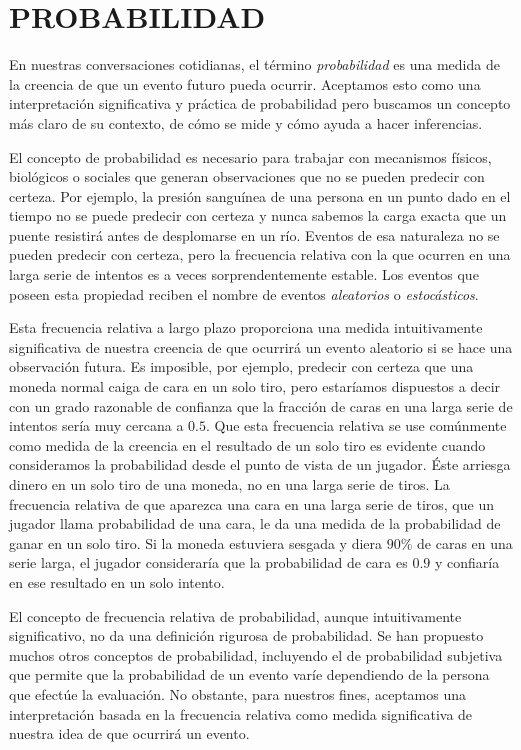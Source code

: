 \chapter{PROBABILIDAD}
\printchaptertableofcontents

En nuestras conversaciones cotidianas, el término \emph{probabilidad} es una medida de la creencia de que un evento futuro pueda ocurrir. Aceptamos esto como una interpretación significativa y práctica de probabilidad pero buscamos un concepto más claro de su contexto, de cómo se mide y cómo ayuda a hacer inferencias.

El concepto de probabilidad es necesario para trabajar con mecanismos físicos, biológicos o sociales que generan observaciones que no se pueden predecir con certeza. Por ejemplo, la presión sanguínea de una persona en un punto dado en el tiempo no se puede predecir con certeza y nunca sabemos la carga exacta que un puente resistirá antes de desplomarse en un río. Eventos de esa naturaleza no se pueden predecir con certeza, pero la frecuencia relativa con la que ocurren en una larga serie de intentos es a veces sorprendentemente estable. Los eventos que poseen esta propiedad reciben el nombre de eventos \emph{aleatorios} o \emph{estocásticos}.

Esta frecuencia relativa a largo plazo proporciona una medida intuitivamente significativa de nuestra creencia de que ocurrirá un evento aleatorio si se hace una observación futura. Es imposible, por ejemplo, predecir con certeza que una moneda normal caiga de cara en un solo tiro, pero estaríamos dispuestos a decir con un grado razonable de confianza que la fracción de caras en una larga serie de intentos sería muy cercana a $0.5$. Que esta frecuencia relativa se use comúnmente como medida de la creencia en el resultado de un solo tiro es evidente cuando consideramos la probabilidad desde el punto de vista de un jugador. Éste arriesga dinero en un solo tiro de una moneda, no en una larga serie de tiros. La frecuencia relativa de que aparezca una cara en una larga serie de tiros, que un jugador llama probabilidad de una cara, le da una medida de la probabilidad de ganar en un solo tiro. Si la moneda estuviera sesgada y diera $90\%$ de caras en una serie larga, el jugador consideraría que la probabilidad de cara es $0.9$ y confiaría en ese resultado en un solo intento.

El concepto de frecuencia relativa de probabilidad, aunque intuitivamente significativo, no da una definición rigurosa de probabilidad. Se han propuesto muchos otros conceptos de probabilidad, incluyendo el de probabilidad subjetiva que permite que la probabilidad de un evento varíe dependiendo de la persona que efectúe la evaluación. No obstante, para nuestros fines, aceptamos una interpretación basada en la frecuencia relativa como medida significativa de nuestra idea de que ocurrirá un evento.

